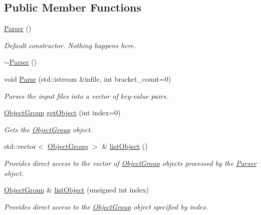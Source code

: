 \subsection*{Public Member Functions}
\begin{DoxyCompactItemize}
\item 
\hyperlink{classosea_1_1_parser_a12234f6cd36b61af4b50c94a179422c1}{Parser} ()
\begin{DoxyCompactList}\small\item\em Default constructor. Nothing happens here. \end{DoxyCompactList}\item 
\hyperlink{classosea_1_1_parser_a3e658b5917a93a3ef648050d060e3a93}{$\sim$\-Parser} ()
\item 
void \hyperlink{classosea_1_1_parser_a819455e27dc19323cdfd2f9354e11ec2}{Parse} (std\-::istream \&infile, int bracket\-\_\-count=0)
\begin{DoxyCompactList}\small\item\em Parses the input files into a vector of key-\/value pairs. \end{DoxyCompactList}\item 
\hyperlink{classosea_1_1_object_group}{Object\-Group} \hyperlink{classosea_1_1_parser_ab8e77da06e72ede97238d28bad4a9ae6}{get\-Object} (int index=0)
\begin{DoxyCompactList}\small\item\em Gets the \hyperlink{classosea_1_1_object_group}{Object\-Group} object. \end{DoxyCompactList}\item 
std\-::vector$<$ \hyperlink{classosea_1_1_object_group}{Object\-Group} $>$ \& \hyperlink{classosea_1_1_parser_a93885957453b4b7e346ee1b2b79d05f8}{list\-Object} ()
\begin{DoxyCompactList}\small\item\em Provides direct access to the vector of \hyperlink{classosea_1_1_object_group}{Object\-Group} objects processed by the \hyperlink{classosea_1_1_parser}{Parser} object. \end{DoxyCompactList}\item 
\hyperlink{classosea_1_1_object_group}{Object\-Group} \& \hyperlink{classosea_1_1_parser_ac7323370460e1373acf710cbe2014c9a}{list\-Object} (unsigned int index)
\begin{DoxyCompactList}\small\item\em Provides direct access to the \hyperlink{classosea_1_1_object_group}{Object\-Group} object specified by index. \end{DoxyCompactList}\item 

\end{DoxyCompactItemize}
